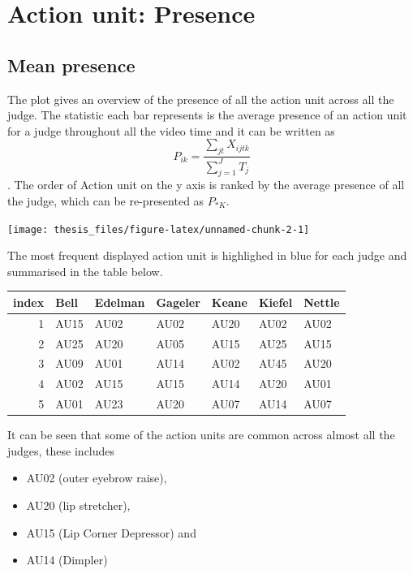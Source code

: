 \documentclass{monashthesis}
\begin{document}
\hypertarget{action-unit-presence}{%
\section{Action unit: Presence}\label{action-unit-presence}}

\hypertarget{mean-presence}{%
\subsection{Mean presence}\label{mean-presence}}

The plot gives an overview of the presence of all the action unit across all the judge. The statistic each bar represents is the average presence of an action unit for a judge throughout all the video time and it can be written as \[P_{ik} = \frac{\sum_{jt}X_{ijtk}}{\sum_{j = 1}^JT_j}\]. The order of Action unit on the y axis is ranked by the average presence of all the judge, which can be re-presented as \(P_{* K}\).

\texttt{[image: thesis\_files/figure-latex/unnamed-chunk-2-1]}

The most frequent displayed action unit is highlighed in blue for each judge and summarised in the table below.

\begin{tabular}{r|l|l|l|l|l|l}
\hline
index & Bell & Edelman & Gageler & Keane & Kiefel & Nettle\\
\hline
1 & AU15 & AU02 & AU02 & AU20 & AU02 & AU02\\
\hline
2 & AU25 & AU20 & AU05 & AU15 & AU25 & AU15\\
\hline
3 & AU09 & AU01 & AU14 & AU02 & AU45 & AU20\\
\hline
4 & AU02 & AU15 & AU15 & AU14 & AU20 & AU01\\
\hline
5 & AU01 & AU23 & AU20 & AU07 & AU14 & AU07\\
\hline
\end{tabular}

It can be seen that some of the action units are common across almost all the judges, these includes

\begin{itemize}
\tightlist
\item
  AU02 (outer eyebrow raise),
\item
  AU20 (lip stretcher),
\item
  AU15 (Lip Corner Depressor) and
\item
  AU14 (Dimpler)
\end{itemize}
\end{document}
